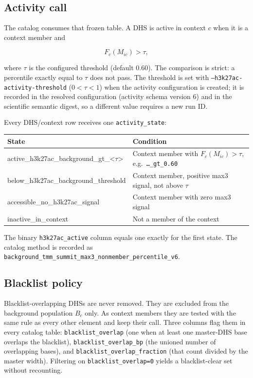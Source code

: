 \documentclass[11pt]{article}
\begin{document}
\subsection{Activity call}

The catalog consumes that frozen table.  A DHS is active in context \(c\) when
it is a context member and

\[
  F_c(M_{ic}) > \tau,
\]

where \(\tau\) is the configured threshold (default 0.60).  The comparison is
strict: a percentile exactly equal to \(\tau\) does not pass.  The threshold is
set with \texttt{--h3k27ac-activity-threshold} (\(0<\tau<1\)) when the
activity configuration is created; it is recorded in the resolved
configuration (activity schema version 6) and in the scientific semantic
digest, so a different value requires a new run ID.

Every DHS/context row receives one \texttt{activity\_state}:

\begin{center}
\begin{tabularx}{0.94\textwidth}{>{\ttfamily}l >{\raggedright\arraybackslash}X}
\toprule
\normalfont State & Condition \\
\midrule
active\_h3k27ac\_background\_gt\_<\(\tau\)> & Context member with \(F_c(M_{ic})>\tau\), e.g.\ \texttt{\ldots\_gt\_0.60} \\
below\_h3k27ac\_background\_threshold & Context member, positive max3 signal, not above \(\tau\) \\
accessible\_no\_h3k27ac\_signal & Context member with zero max3 signal \\
inactive\_in\_context & Not a member of the context \\
\bottomrule
\end{tabularx}
\end{center}

The binary \texttt{h3k27ac\_active} column equals one exactly for the first
state.  The catalog method is recorded as
\texttt{background\_tmm\_summit\_max3\_nonmember\_percentile\_v6}.

\subsection{Blacklist policy}

Blacklist-overlapping DHSs are never removed.  They are excluded from the
background population \(B_c\) only.  As context members they are tested with
the same rule as every other element and keep their call.  Three columns flag
them in every catalog table: \texttt{blacklist\_overlap} (one when at least one
master-DHS base overlaps the blacklist), \texttt{blacklist\_overlap\_bp} (the
unioned number of overlapping bases), and \texttt{blacklist\_overlap\_fraction}
(that count divided by the master width).  Filtering on
\texttt{blacklist\_overlap=0} yields a blacklist-clear set without recounting.
\end{document}
